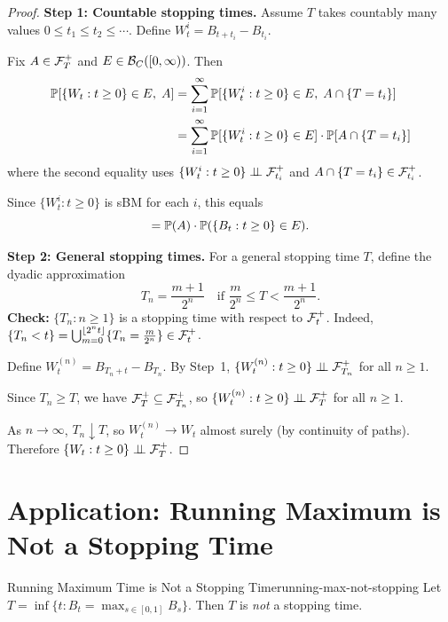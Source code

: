 \begin{proof}
    \textbf{Step 1: Countable stopping times.}\;
    Assume $T$ takes countably many values $0 \leq t_1 \leq t_2 \leq \cdots$. Define $W_t^i = B_{t+t_i} - B_{t_i}$.

    Fix $A \in \mathcal{F}_T^+$ and $E \in \mathcal{B}_C([0,\infty))$. Then
    \begin{align*}
        \mathbb{P}[\{W_t : t \geq 0\} \in E,\; A]
        &= \sum_{i=1}^{\infty} \mathbb{P}[\{W_t^i : t \geq 0\} \in E,\; A \cap \{T = t_i\}] \\
        &= \sum_{i=1}^{\infty} \mathbb{P}[\{W_t^i : t \geq 0\} \in E] \cdot \mathbb{P}[A \cap \{T = t_i\}]
    \end{align*}
    where the second equality uses $\{W_t^i : t \geq 0\} \perp\!\!\!\perp \mathcal{F}_{t_i}^+$ and $A \cap \{T = t_i\} \in \mathcal{F}_{t_i}^+$.

    Since $\{W_t^i : t \geq 0\}$ is sBM for each $i$, this equals
    \[
        = \mathbb{P}(A) \cdot \mathbb{P}(\{B_t : t \geq 0\} \in E).
    \]

    \medskip
    \textbf{Step 2: General stopping times.}\;
    For a general stopping time $T$, define the dyadic approximation
    \[
        T_n = \frac{m+1}{2^n} \quad \text{if } \frac{m}{2^n} \leq T < \frac{m+1}{2^n}.
    \]
    \textbf{Check:} $\{T_n : n \geq 1\}$ is a stopping time with respect to $\mathcal{F}_t^+$.
    Indeed, $\{T_n < t\} = \bigcup_{m=0}^{\lfloor 2^n t \rfloor} \{T_n = \frac{m}{2^n}\} \in \mathcal{F}_t^+$.

    Define $W_t^{(n)} = B_{T_n + t} - B_{T_n}$. By Step~1, $\{W_t^{(n)} : t \geq 0\} \perp\!\!\!\perp \mathcal{F}_{T_n}^+$ for all $n \geq 1$.

    Since $T_n \geq T$, we have $\mathcal{F}_T^+ \subseteq \mathcal{F}_{T_n}^+$, so $\{W_t^{(n)} : t \geq 0\} \perp\!\!\!\perp \mathcal{F}_T^+$ for all $n \geq 1$.

    As $n \to \infty$, $T_n \downarrow T$, so $W_t^{(n)} \to W_t$ almost surely (by continuity of paths). Therefore $\{W_t : t \geq 0\} \perp\!\!\!\perp \mathcal{F}_T^+$.
\end{proof}

\section{Application: Running Maximum is Not a Stopping Time}

\begin{lemma}{Running Maximum Time is Not a Stopping Time}{running-max-not-stopping}
    Let $T = \inf\{t : B_t = \max_{s \in [0,1]} B_s\}$. Then $T$ is \emph{not} a stopping time.
\end{lemma}

